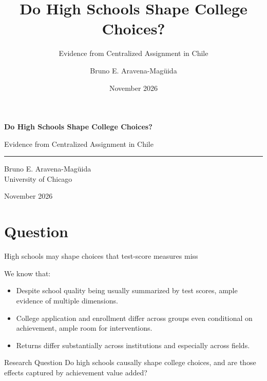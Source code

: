 \documentclass[11pt,aspectratio=169]{beamer}
\title{Do High Schools Shape College Choices?}
\subtitle{Evidence from Centralized Assignment in Chile}
\author{Bruno E. Aravena-Mag\"uida}
\institute{University of Chicago}
\date{November 2026}
\let\oldparencite\parencite
\renewcommand{\parencite}[2][]{%
  \footnotesize {\tiny \oldparencite[#1]{#2}} \normalsize%
}
\newenvironment{wideitemize}{%
  \begin{minipage}{0.92\textwidth}
  \begin{itemize}
  \addtolength{\itemsep}{0.75em}
}{%
  \end{itemize}
  \end{minipage}
}
\begin{document}
\begin{frame}[plain,t]
\vspace{1.25cm}
{\LARGE\bfseries Do High Schools Shape College Choices?\par}
\vspace{-0.05em}
{\large Evidence from Centralized Assignment in Chile\par}
\vspace{0.8em}
\rule{\textwidth}{0.4pt}
\vspace{0.9em}

Bruno E. Aravena-Mag\"uida\\
University of Chicago

\vspace{0.6em}
November 2026
\end{frame}

\section{Question}

\begin{frame}{High schools may shape choices that test-score measures miss}

  We know that:\par
  \vspace{0.05em}
  \begin{wideitemize}
  \addtolength{\itemsep}{-0.55em}
  \item Despite school quality being usually summarized by test scores, ample evidence of multiple dimensions. \parencite{jackson_what_2018,beuermann_what_2023,rose_effects_2022}

  \item College application and enrollment differ across groups even conditional on achievement, ample room for interventions. \parencite{hoxby_what_2015,dynarski_closing_2021,hastings_informed_2016,chetty_diversifying_2025}

  \item Returns differ substantially across institutions and especially across fields. \parencite{kirkeboen_field_2016}
\end{wideitemize}

\begin{alertblock}{Research Question}
\vspace{0.35em}
Do high schools causally shape college choices, and are those effects captured by achievement value added?
\end{alertblock}
\end{frame}
\end{document}
